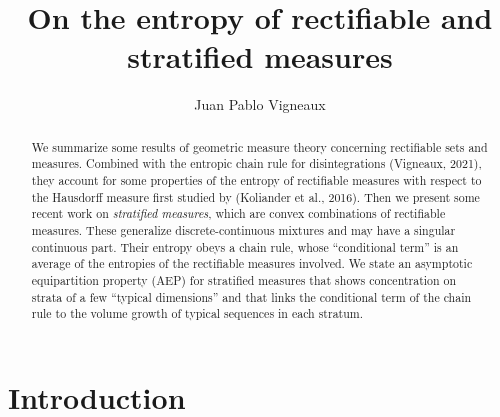 \documentclass[runningheads]{llncs}
\begin{document}
%
\title{On the entropy of rectifiable and stratified measures}  %
%
%
\author{
Juan Pablo Vigneaux%
}


%
%
%
\maketitle              %
%
\begin{abstract}
We summarize some results of geometric measure theory concerning rectifiable sets and measures. Combined  with the entropic chain rule for disintegrations  (Vigneaux, 2021), they   account for some  properties of the entropy of rectifiable measures with respect to the Hausdorff measure first studied by (Koliander et al., 
 2016). Then we present  some recent work on \emph{stratified measures}, which are convex combinations of rectifiable measures. These generalize discrete-continuous mixtures and may have a singular continuous part. Their entropy obeys a chain rule, whose ``conditional term''  is an average of the entropies of the rectifiable measures involved. We state an asymptotic equipartition property (AEP) for stratified measures that shows concentration on strata of a few ``typical dimensions'' and that links the conditional term  of the chain rule to the volume growth of typical sequences in each stratum. 

\end{abstract}
%
%
%
\section{Introduction}
\end{document}
